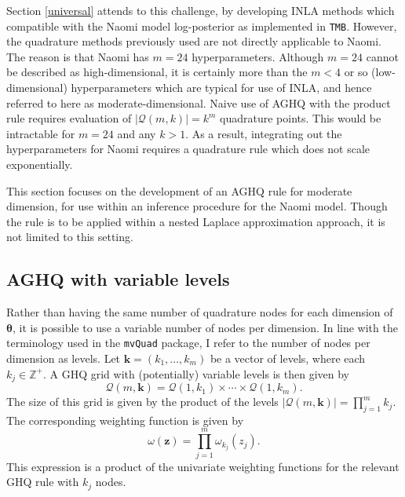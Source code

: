 \documentclass[a4paper, nobind]{templates/ociamthesis}
\begin{document}
Section \ref{universal} attends to this challenge, by developing INLA methods which compatible with the Naomi model log-posterior as implemented in \texttt{TMB}.
However, the quadrature methods previously used are not directly applicable to Naomi.
The reason is that Naomi has \(m = 24\) hyperparameters.
Although \(m = 24\) cannot be described as high-dimensional, it is certainly more than the \(m < 4\) or so (low-dimensional) hyperparameters which are typical for use of INLA, and hence referred to here as moderate-dimensional.
Naive use of AGHQ with the product rule requires evaluation of \(|\mathcal{Q}(m, k)| = k^m\) quadrature points.
This would be intractable for \(m = 24\) and any \(k > 1\).
As a result, integrating out the hyperparameters for Naomi requires a quadrature rule which does not scale exponentially.

This section focuses on the development of an AGHQ rule for moderate dimension, for use within an inference procedure for the Naomi model.
Though the rule is to be applied within a nested Laplace approximation approach, it is not limited to this setting.

\hypertarget{aghq-with-variable-levels}{%
\subsection{AGHQ with variable levels}\label{aghq-with-variable-levels}}

Rather than having the same number of quadrature nodes for each dimension of \(\boldsymbol{\mathbf{\theta}}\), it is possible to use a variable number of nodes per dimension.
In line with the terminology used in the \texttt{mvQuad} package, I refer to the number of nodes per dimension as levels.
Let \(\mathbf{k} = (k_1, \ldots, k_m)\) be a vector of levels, where each \(k_j \in \mathbb{Z}^+\).
A GHQ grid with (potentially) variable levels is then given by
\begin{equation}
\mathcal{Q}(m, \mathbf{k}) = \mathcal{Q}(1, k_1) \times \cdots \times \mathcal{Q}(1, k_m).
\end{equation}
The size of this grid is given by the product of the levels \(|\mathcal{Q}(m, \mathbf{k})| = \prod_{j = 1}^m k_j\).
The corresponding weighting function is given by
\begin{equation}
\omega(\mathbf{z}) = \prod_{j = 1}^m \omega_{k_j}(z_j).
\end{equation}
This expression is a product of the univariate weighting functions for the relevant GHQ rule with \(k_j\) nodes.
\end{document}
